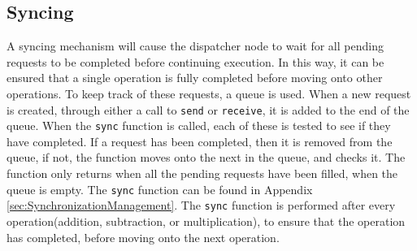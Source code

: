 \subsection{Syncing}
A syncing mechanism will cause the dispatcher node to wait for all pending requests to be completed before continuing execution. In this way, it can be ensured that a single operation is fully completed before moving onto other operations. To keep track of these requests, a queue is used. When a new request is created, through either a call to \verb|send| or \verb|receive|, it is added to the end of the queue. When the \verb|sync| function is called, each of these is tested to see if they have completed. If a request has been completed, then it is removed from the queue, if not, the function moves onto the next in the queue, and checks it. The function only returns when all the pending requests have been filled, when the queue is empty. The \verb|sync| function can be found in Appendix \ref{sec:SynchronizationManagement}. The \verb|sync| function is performed after every operation(addition, subtraction, or multiplication), to ensure that the operation has completed, before moving onto the next operation.